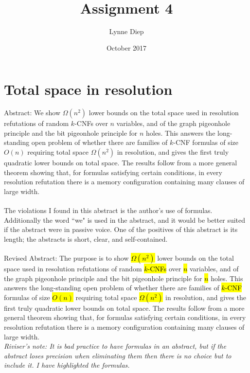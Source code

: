 \documentclass{article}
\title{Assignment 4}
\author{Lynne Diep }
\date{October 2017}
\begin{document}
\maketitle

\section{Total space in resolution}
Abstract: We show $\Omega (n^2)$ lower bounds on the total space used in resolution refutations of random $k$-CNFs over $n$ variables, and of the graph pigeonhole principle and the bit pigeonhole principle for $n$ holes. This answers the long-standing open problem of whether there are families of $k$-CNF formulas of size $O(n)$ requiring total space $\Omega(n^2)$ in resolution, and gives the first truly quadratic lower bounds on total space. The results follow from a more general theorem showing that, for formulas satisfying certain conditions, in every resolution refutation there is a memory configuration containing many clauses of large width.
\\
\\
The violations I found in this abstract is the author's use of formulas. Additionally the word ``we" is used in the abstract, and it would be better suited if the abstract were in passive voice. One of the positives of this abstract is its length; the abstracts is short, clear, and self-contained.
\\
\\
Revised Abstract:
The purpose is to show \hl{$\Omega (n^2)$} lower bounds on the total space used in resolution refutations of random \hl{$k$-CNFs} over \hl{$n$} variables, and of the graph pigeonhole principle and the bit pigeonhole principle for \hl{$n$} holes. This answers the long-standing open problem of whether there are families of \hl{$k$-CNF} formulas of size \hl{$O(n)$} requiring total space \hl{$\Omega(n^2)$} in resolution, and gives the first truly quadratic lower bounds on total space. The results follow from a more general theorem showing that, for formulas satisfying certain conditions, in every resolution refutation there is a memory configuration containing many clauses of large width.
\\
{\em{Riviser's note}: It is bad practice to have formulas in an abstract, but if the abstract loses precision when eliminating them then there is no choice but to include it. I have highlighted the formulas.}
\end{document}

